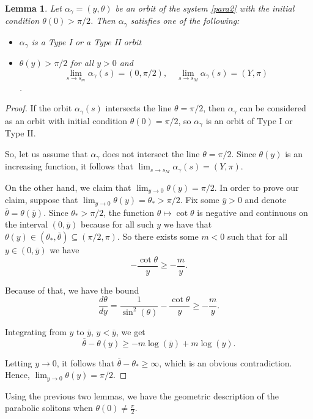 \documentclass[12pt]{amsart}
\theoremstyle{plain}
\newtheorem{lemma}[theorem]{Lemma}
\theoremstyle{definition}
\begin{document}
\begin{lemma}\label{le59}
    Let $\alpha_\gamma = (y, \theta)$ be an orbit of the system \eqref{para2} with the initial condition $\theta(0) > \pi/2$. Then $\alpha_\gamma$ satisfies one of the following:
    \begin{itemize}
	\item[i)] $\alpha_\gamma$ is a Type I or a Type II orbit
	\item[ii)] $\theta(y) > \pi/2$ for all $y > 0$ and $$\lim_{s \to s_m} \alpha_\gamma(s) = (0, \pi/2), \quad \lim_{s \to s_M} \alpha_\gamma(s) = (Y, \pi)$$.
    \end{itemize}
\end{lemma}

\begin{proof}
   	If the orbit $\alpha_\gamma(s)$ intersects the line $\theta = \pi/2$, then $\alpha_\gamma$ can be considered as an orbit with initial condition $\theta(0) = \pi/2$, so $\alpha_\gamma$ is an orbit of Type I or Type II.

	So, let us assume that $\alpha_\gamma$ does not intersect the line $\theta = \pi/2$. Since $\theta(y)$ is an increasing function, it follows that $\lim_{s \to s_M} \alpha_\gamma(s) = (Y, \pi)$.

	On the other hand, we claim that $\lim_{y \to 0} \theta(y) = \pi/2$. In order to prove our claim, suppose that $\lim_{y \to 0} \theta(y) = \theta_\ast > \pi/2$. Fix some $\overline{y} > 0$ and denote $\overline{\theta} = \theta(\overline{y})$. Since $\theta_\ast > \pi/2$, the function $\theta \mapsto \cot\theta$ is negative and continuous on the interval $(0, \overline{y})$ because for all such $y$ we have that $\theta(y) \in (\theta_\ast, \overline{\theta}) \subseteq (\pi/2, \pi)$. So there exists some $m < 0$ such that for all $y \in (0, \overline{y})$ we have
	$$  - \frac{\cot\theta}{y} \geq - \frac{m}{y}.$$

	Because of that, we have the bound
	$$\frac{d\theta}{dy} = \frac{1}{\sin^2(\theta)} - \frac{\cot \theta}{y} \geq - \frac{m}{y}.$$

	Integrating from $y$ to $\overline{y}$, $y < \overline{y}$, we get
	$$\overline{\theta} - \theta(y) \geq -m\log(\overline{y}) + m\log(y).$$

	Letting $y \to 0$, it follows that $\overline{\theta} - \theta_\ast \geq \infty$, which is an obvious contradiction. Hence, $\lim_{y \to 0} \theta(y) = \pi/2$.
\end{proof}

Using the previous two lemmas, we have the geometric description of the parabolic solitons when  $\theta(0)\not=\frac{\pi}{2}$.  
\end{document}
